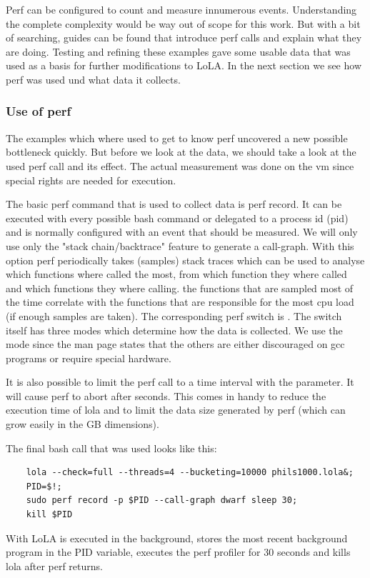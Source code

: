 Perf can be configured to count and measure innumerous events. Understanding the complete complexity would be way out of scope for this work. But with a bit of searching, guides can be found that introduce perf calls and explain what they are doing\cite{perfExamples}. Testing and refining these examples gave some usable data that was used as a basis for further modifications to LoLA. In the next section we see how perf was used und what data it collects.

\subsubsection{Use of perf}
The examples which where used to get to know perf uncovered a new possible bottleneck quickly. But before we look at the data, we should take a look at the used perf call and its effect. The actual measurement was done on the vm since special rights are needed for execution.

The basic perf command that is used to collect data is perf record. It can be executed with every possible bash command or delegated to a process id (pid) and is normally configured with an event that should be measured. We will only use only the "stack chain/backtrace" feature to generate a call-graph. With this option perf periodically takes (samples) stack traces which can be used to analyse which functions where called the most, from which function they where called and which functions they where calling. the functions that are sampled most of the time correlate with the functions that are responsible for the most cpu load (if enough samples are taken). The corresponding perf switch is . The switch itself has three modes which determine how the data is collected. We use the  mode since the man page states that the others are either discouraged on gcc programs or require special hardware.

It is also possible to limit the perf call to a time interval with the  parameter. It will cause perf to abort after  seconds. This comes in handy to reduce the execution time of lola and to limit the data size generated by perf (which can grow easily in the GB dimensions).

The final bash call that was used looks like this:
\begin{lstlisting}
    lola --check=full --threads=4 --bucketing=10000 phils1000.lola&;
    PID=$!;
    sudo perf record -p $PID --call-graph dwarf sleep 30;
    kill $PID
\end{lstlisting}
With  LoLA  is executed in the background,  stores the most recent background program in the PID variable,  executes the perf profiler for 30 seconds and  kills lola after perf returns.

